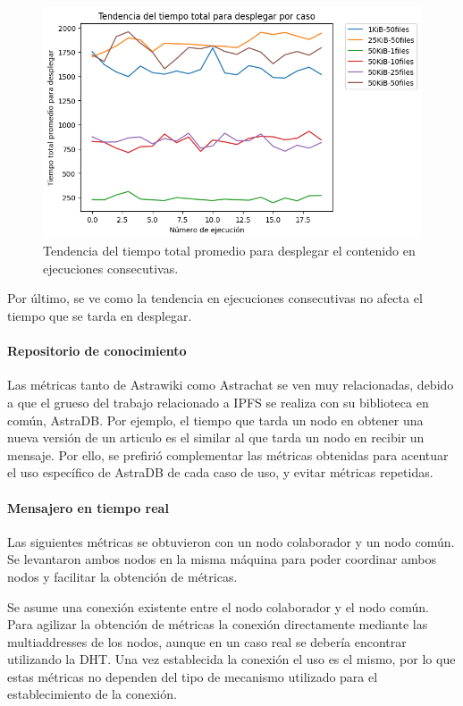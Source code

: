 \begin{figure}[H]
    \centering
    \includegraphics[width=0.9\linewidth]{img/metricas-ipfs/tendencia-desplegar.png}
    \caption{Tendencia del tiempo total promedio para desplegar el contenido en ejecuciones consecutivas.}
    \label{fig:tendencia-desplegar.png}
\end{figure}

Por último, se ve como la tendencia en ejecuciones consecutivas no afecta el tiempo que se tarda en desplegar.

\paragraph{Repositorio de conocimiento}

Las métricas tanto de Astrawiki como Astrachat se ven muy relacionadas, debido a que el grueso del trabajo relacionado a IPFS se realiza con su biblioteca en común, AstraDB. Por ejemplo, el tiempo que tarda un nodo en obtener una nueva versión de un articulo es el similar al que tarda un nodo en recibir un mensaje. Por ello, se prefirió complementar las métricas obtenidas para acentuar el uso específico de AstraDB de cada caso de uso, y evitar métricas repetidas. 

\paragraph{Mensajero en tiempo real}

Las siguientes métricas se obtuvieron con un nodo colaborador y un nodo común. Se levantaron ambos nodos en la misma máquina para poder coordinar ambos nodos y facilitar la obtención de métricas.

Se asume una conexión existente entre el nodo colaborador y el nodo común. Para agilizar la obtención de métricas la conexión directamente mediante las multiaddresses de los nodos, aunque en un caso real se debería encontrar utilizando la DHT. Una vez establecida la conexión el uso es el mismo, por lo que estas métricas no dependen del tipo de mecanismo utilizado para el establecimiento de la conexión.

